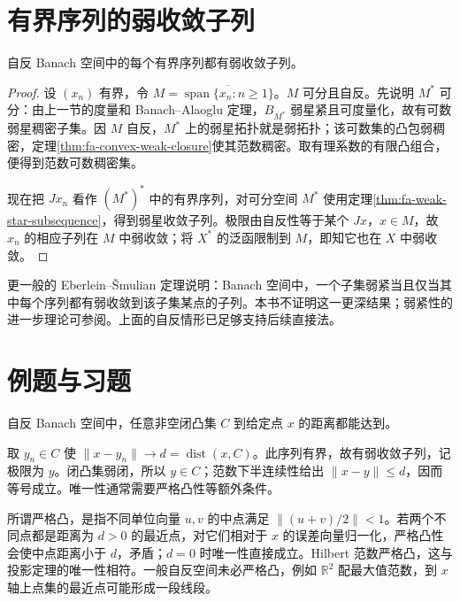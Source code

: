 \section{有界序列的弱收敛子列}
\begin{theorem}\label{thm:fa-reflexive-subsequence}
自反 Banach 空间中的每个有界序列都有弱收敛子列。
\end{theorem}
\begin{proof}
设 $(x_n)$ 有界，令 $M=\overline{\operatorname{span}\{x_n:n\geq1\}}$。$M$ 可分且自反。先说明 $M^*$ 可分：由上一节的度量和 Banach--Alaoglu 定理，$B_{M^*}$ 弱星紧且可度量化，故有可数弱星稠密子集。因 $M$ 自反，$M^*$ 上的弱星拓扑就是弱拓扑；该可数集的凸包弱稠密，定理\ref{thm:fa-convex-weak-closure}使其范数稠密。取有理系数的有限凸组合，便得到范数可数稠密集。

现在把 $Jx_n$ 看作 $(M^*)^*$ 中的有界序列，对可分空间 $M^*$ 使用定理\ref{thm:fa-weak-star-subsequence}，得到弱星收敛子列。极限由自反性等于某个 $Jx$，$x\in M$，故 $x_n$ 的相应子列在 $M$ 中弱收敛；将 $X^*$ 的泛函限制到 $M$，即知它也在 $X$ 中弱收敛。
\end{proof}
更一般的 Eberlein--Šmulian 定理说明：Banach 空间中，一个子集弱紧当且仅当其中每个序列都有弱收敛到该子集某点的子列。本书不证明这一更深结果；弱紧性的进一步理论可参阅\cite{teschl-fa}。上面的自反情形已足够支持后续直接法。

\section{例题与习题}
\begin{example}[最近点存在]
自反 Banach 空间中，任意非空闭凸集 $C$ 到给定点 $x$ 的距离都能达到。
\end{example}
\begin{solve}
取 $y_n\in C$ 使 $\|x-y_n\|\to d=\operatorname{dist}(x,C)$。此序列有界，故有弱收敛子列，记极限为 $y$。闭凸集弱闭，所以 $y\in C$；范数下半连续性给出 $\|x-y\|\leq d$，因而等号成立。唯一性通常需要严格凸性等额外条件。
\end{solve}

所谓严格凸，是指不同单位向量 $u,v$ 的中点满足 $\|(u+v)/2\|<1$。若两个不同点都是距离为 $d>0$ 的最近点，对它们相对于 $x$ 的误差向量归一化，严格凸性会使中点距离小于 $d$，矛盾；$d=0$ 时唯一性直接成立。Hilbert 范数严格凸，这与投影定理的唯一性相符。一般自反空间未必严格凸，例如 $\mathbb R^2$ 配最大值范数，到 $x$ 轴上点集的最近点可能形成一段线段。

